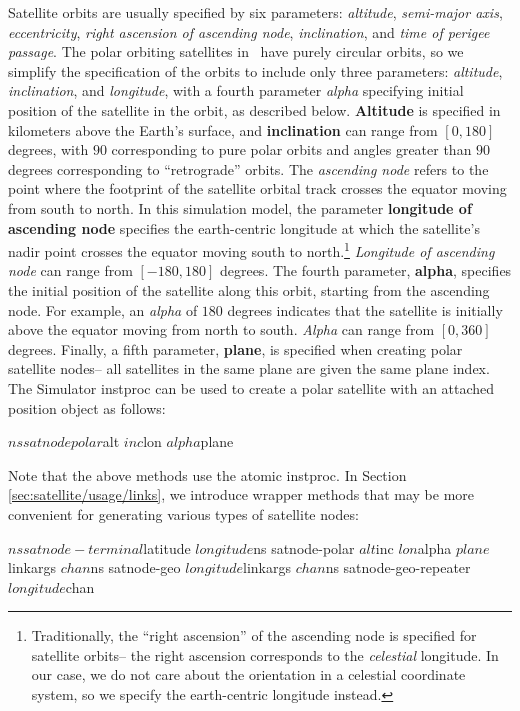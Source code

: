 \begin{itemize}
Satellite orbits are usually specified by six parameters:  {\em altitude},
{\em semi-major axis}, {\em eccentricity}, 
{\em right ascension of ascending node}, {\em inclination}, and
{\em time of perigee passage}.  The polar orbiting satellites in \ns~have
purely circular orbits, so we simplify the specification of the orbits to
include only three parameters: {\em altitude}, {\em inclination}, and
{\em longitude}, with a fourth parameter {\em alpha} specifying initial 
position of the satellite in the orbit, as described below.
{\bf Altitude} is specified in kilometers above the Earth's surface, and 
{\bf inclination} can range from $[0,180]$ degrees, with $90$ corresponding
to pure polar orbits and angles greater than $90$ degrees corresponding
to ``retrograde'' orbits.  The {\em ascending node} refers to the point
where the footprint of the satellite orbital track crosses the equator 
moving from south to north.  In this simulation model, the parameter 
{\bf longitude of ascending node} specifies the earth-centric longitude at 
which the satellite's nadir point crosses the equator moving south
to north.\footnote{Traditionally, the ``right ascension'' of the ascending
node is specified for satellite orbits-- the right ascension corresponds to the 
{\em celestial} longitude.  In our case, we do not care about the
orientation in a celestial coordinate system, so we specify the earth-centric
longitude instead.} {\em Longitude of ascending node} can range from 
$[-180,180]$ degrees.  The fourth parameter,
{\bf alpha}, specifies the initial position of the satellite along this
orbit, starting from the ascending node.  
For example, an {\em alpha} of $180$ degrees indicates that the
satellite is initially above the equator moving from north to south.
{\em Alpha} can range from $[0,360]$ degrees.
Finally, a fifth parameter, {\bf plane}, is specified when creating
polar satellite nodes-- all satellites in the same plane are given the
same plane index.
The Simulator instproc  can be 
used to create a polar satellite with an attached position object as 
follows:
\begin{program}
$ns satnode polar $alt $inc $lon $alpha $plane
\end{program}

Note that the above methods use the atomic  instproc.  In 
Section \ref{sec:satellite/usage/links}, we introduce wrapper methods
that may be more convenient for generating various types of satellite nodes:
\begin{program}
$ns satnode-terminal $latitude $longitude
$ns satnode-polar $alt $inc $lon $alpha $plane $linkargs $chan
$ns satnode-geo $longitude $linkargs $chan
$ns satnode-geo-repeater $longitude $chan
\end{program}
\end{itemize}

